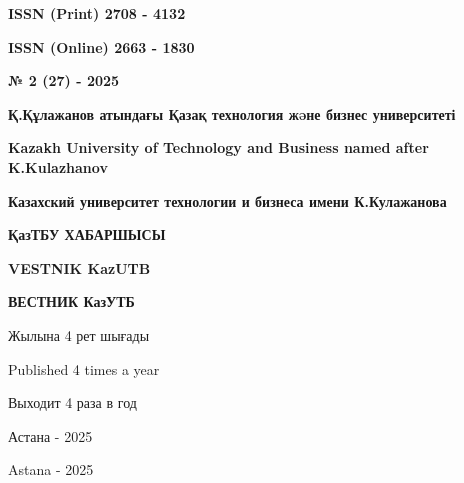 \begin{flushright}
\textbf{ISSN (Print) 2708 - 4132}

\textbf{ISSN (Online) 2663 - 1830}

\vspace{1cm}

\textbf{№ 2 (27) - 2025}
\end{flushright}

\vfill

\begin{center}
\textbf{\large Қ.Құлажанов атындағы Қазақ технология жəне бизнес университеті}

\vspace{0.3cm}

\textbf{\large Kazakh University of Technology and Business named after K.Kulazhanov}

\vspace{0.3cm}

\textbf{\large Казахский университет технологии и бизнеса имени К.Кулажанова}

\vfill

\textbf{\huge ҚазТБУ ХАБАРШЫСЫ}

\vspace{0.5cm}

\textbf{\huge VESTNIK KazUTB}

\vspace{0.5cm}

\textbf{\huge ВЕСТНИК КазУТБ}

\vfill

Жылына 4 рет шығады

Published 4 times a year

Выходит 4 раза в год

\vfill

Астана - 2025

Astana - 2025
\end{center}

